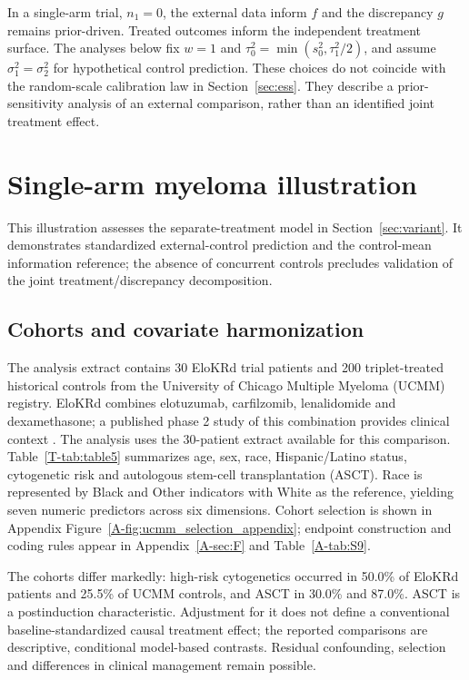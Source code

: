 \documentclass[11pt]{article}
\begin{document}
In a single-arm trial, $n_1=0$, the external data inform $f$ and the discrepancy $g$ remains prior-driven. Treated outcomes inform the independent treatment surface. The analyses below fix $w=1$ and $\tau_0^2=\min(s_0^2,\tau_1^2/2)$, and assume $\sigma_1^2=\sigma_2^2$ for hypothetical control prediction. These choices do not coincide with the random-scale calibration law in Section~\ref{sec:ess}. They describe a prior-sensitivity analysis of an external comparison, rather than an identified joint treatment effect.

\section{Single-arm myeloma illustration}\label{sec:application}
This illustration assesses the separate-treatment model in Section~\ref{sec:variant}. It demonstrates standardized external-control prediction and the control-mean information reference; the absence of concurrent controls precludes validation of the joint treatment/discrepancy decomposition.

\subsection{Cohorts and covariate harmonization}
The analysis extract contains 30 EloKRd trial patients and 200 triplet-treated historical controls from the University of Chicago Multiple Myeloma (UCMM) registry. EloKRd combines elotuzumab, carfilzomib, lenalidomide and dexamethasone; a published phase 2 study of this combination provides clinical context \citep{Derman2022}. The analysis uses the 30-patient extract available for this comparison. Table~\ref{T-tab:table5} summarizes age, sex, race, Hispanic/Latino status, cytogenetic risk and autologous stem-cell transplantation (ASCT). Race is represented by Black and Other indicators with White as the reference, yielding seven numeric predictors across six dimensions. Cohort selection is shown in Appendix Figure~\ref{A-fig:ucmm_selection_appendix}; endpoint construction and coding rules appear in Appendix~\ref{A-sec:F} and Table~\ref{A-tab:S9}.

The cohorts differ markedly: high-risk cytogenetics occurred in 50.0\% of EloKRd patients and 25.5\% of UCMM controls, and ASCT in 30.0\% and 87.0\%. ASCT is a postinduction characteristic. Adjustment for it does not define a conventional baseline-standardized causal treatment effect; the reported comparisons are descriptive, conditional model-based contrasts. Residual confounding, selection and differences in clinical management remain possible.
\end{document}
